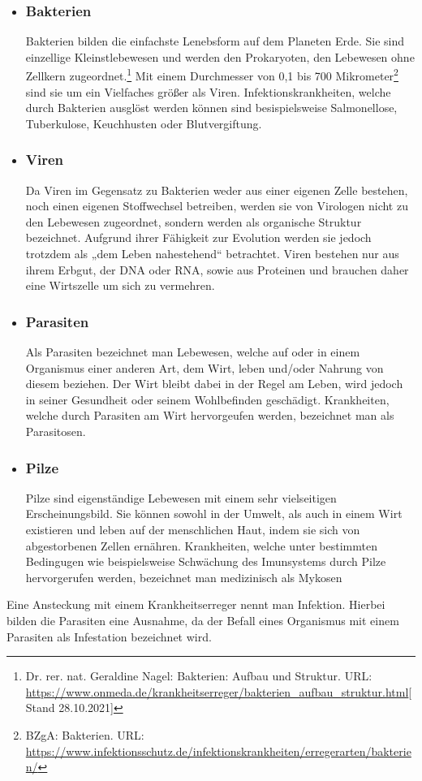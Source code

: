 \documentclass[12pt]{article}
\begin{document}
\begin{itemize}
    \item \subsubsection{Bakterien}
    Bakterien bilden die einfachste Lenebsform auf dem Planeten Erde. Sie sind einzellige Kleinstlebewesen und werden den Prokaryoten, den Lebewesen ohne Zellkern zugeordnet.\footnote{Dr. rer. nat. Geraldine Nagel: Bakterien: Aufbau und Struktur. URL: \url{https://www.onmeda.de/krankheitserreger/bakterien_aufbau_struktur.html}[Stand 28.10.2021]} Mit einem Durchmesser von 0,1 bis 700 Mikrometer\footnote{BZgA: Bakterien. URL: \url{https://www.infektionsschutz.de/infektionskrankheiten/erregerarten/bakterien/}} sind sie um ein Vielfaches größer als Viren. Infektionskrankheiten, welche durch Bakterien ausglöst werden können sind besispielsweise Salmonellose, Tuberkulose, Keuchhusten oder Blutvergiftung.
    \item \subsubsection{Viren}
    Da Viren im Gegensatz zu Bakterien weder aus einer eigenen Zelle bestehen, noch einen eigenen Stoffwechsel betreiben, werden sie von Virologen nicht zu den Lebewesen zugeordnet, sondern werden als organische Struktur bezeichnet. Aufgrund ihrer Fähigkeit zur Evolution werden sie jedoch trotzdem als „dem Leben nahestehend“ betrachtet. Viren bestehen nur aus ihrem Erbgut, der DNA oder RNA, sowie aus Proteinen und brauchen daher eine Wirtszelle um sich zu vermehren.
    \item \subsubsection{Parasiten}
    Als Parasiten bezeichnet man Lebewesen, welche auf oder in einem Organismus einer anderen Art, dem Wirt, leben und/oder Nahrung von diesem beziehen. Der Wirt bleibt dabei in der Regel am Leben, wird jedoch in seiner Gesundheit oder seinem Wohlbefinden geschädigt. Krankheiten, welche durch Parasiten am Wirt hervorgeufen werden, bezeichnet man als Parasitosen. 
    \item \subsubsection{Pilze}
    Pilze sind eigenständige Lebewesen mit einem sehr vielseitigen Erscheinungsbild. Sie können sowohl in der Umwelt, als auch in einem Wirt existieren und leben auf der menschlichen Haut, indem sie sich von abgestorbenen Zellen ernähren. Krankheiten, welche unter bestimmten Bedingugen wie beispielsweise Schwächung des Imunsystems durch Pilze hervorgerufen werden, bezeichnet man medizinisch als Mykosen 
    
\end{itemize}
Eine Ansteckung mit einem Krankheitserreger nennt man Infektion. Hierbei bilden die Parasiten eine Ausnahme, da der Befall eines Organismus mit einem Parasiten als Infestation bezeichnet wird.
\end{document}
